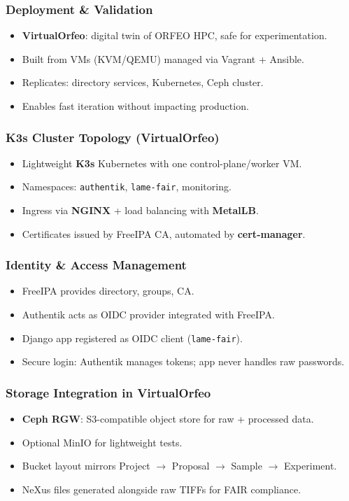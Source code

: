 \documentclass{beamer}
\begin{document}
\begin{frame}
	\frametitle{Deployment \& Validation}
	\begin{itemize}
		\item \textbf{VirtualOrfeo}: digital twin of ORFEO HPC, safe for experimentation.
		\item Built from VMs (KVM/QEMU) managed via Vagrant + Ansible.
		\item Replicates: directory services, Kubernetes, Ceph cluster.
		\item Enables fast iteration without impacting production.
	\end{itemize}
\end{frame}

\begin{frame}
	\frametitle{K3s Cluster Topology (VirtualOrfeo)}
	\begin{itemize}
		\item Lightweight \textbf{K3s} Kubernetes with one control-plane/worker VM.
		\item Namespaces: \texttt{authentik}, \texttt{lame-fair}, monitoring.
		\item Ingress via \textbf{NGINX} + load balancing with \textbf{MetalLB}.
		\item Certificates issued by FreeIPA CA, automated by \textbf{cert-manager}.
	\end{itemize}
\end{frame}

\begin{frame}
	\frametitle{Identity \& Access Management}
	\begin{itemize}
		\item FreeIPA provides directory, groups, CA.
		\item Authentik acts as OIDC provider integrated with FreeIPA.
		\item Django app registered as OIDC client (\texttt{lame-fair}).
		\item Secure login: Authentik manages tokens; app never handles raw passwords.
	\end{itemize}
\end{frame}

\begin{frame}
	\frametitle{Storage Integration in VirtualOrfeo}
	\begin{itemize}
		\item \textbf{Ceph RGW}: S3-compatible object store for raw + processed data.
		\item Optional MinIO for lightweight tests.
		\item Bucket layout mirrors Project $\rightarrow$ Proposal $\rightarrow$ Sample $\rightarrow$ Experiment.
		\item NeXus files generated alongside raw TIFFs for FAIR compliance.
	\end{itemize}
\end{frame}
\end{document}
